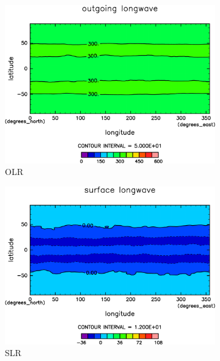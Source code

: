 \documentclass[body]{subfiles}
\begin{document}
\begin{figure}[t]
	\centering
	\begin{subfigure}{.4\textwidth}
		\centering
		\includegraphics[width=\textwidth]{S1500-nc/OLR,time=3650:4015-crop-rotate.pdf}
		\caption{OLR \hmu*{[W/m^{-2}]}}\label{S1500ncOLR}
	\end{subfigure}
	\begin{subfigure}{.4\textwidth}
		\centering
		\includegraphics[width=\textwidth]{S1500-nc/SLR,time=3650:4015-crop-rotate.pdf}
		\caption{SLR\hmu*{[W/m^{-2}]}}\label{S1500ncSLR}
	\end{subfigure}
	\begin{subfigure}{.4\textwidth}
		\centering

\end{subfigure}
\end{figure}
\end{document}
